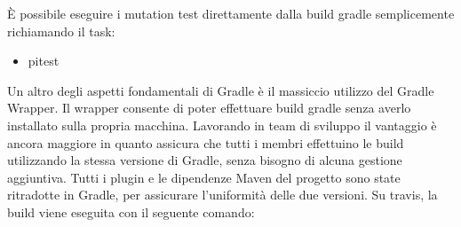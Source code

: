 È possibile eseguire i mutation test direttamente dalla build gradle semplicemente richiamando il task:
\begin{itemize}
	\item pitest
\end{itemize}
\vspace{0.5cm}

Un altro degli aspetti fondamentali di Gradle è il massiccio utilizzo del Gradle Wrapper.\newline
Il wrapper consente di poter effettuare build gradle senza averlo installato sulla propria macchina. Lavorando in team di sviluppo il vantaggio è ancora maggiore in quanto assicura che tutti i membri effettuino le build utilizzando la stessa versione di Gradle, senza bisogno di alcuna gestione aggiuntiva.\newline\newline
Tutti i plugin e le dipendenze Maven del progetto sono state ritradotte in Gradle, per assicurare l'uniformità delle due versioni. Su travis, la build viene eseguita con il seguente comando:\newline

